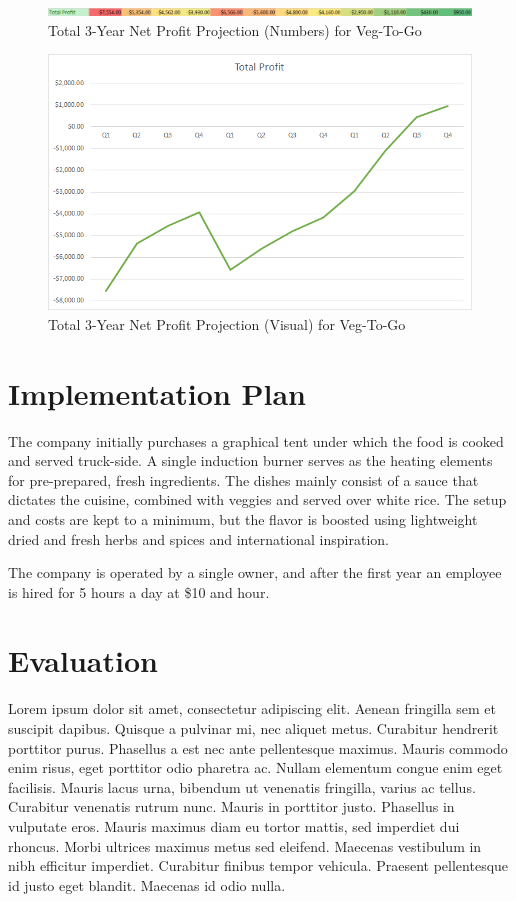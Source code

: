 \documentclass[12pt, letterpaper]{article}
\newcommand{\companyname}{Veg-To-Go}
\begin{document}
\begin{figure}[H]
	\caption{Total 3-Year Net Profit Projection (Numbers) for \companyname{}}
	\includegraphics[width=\textwidth]{TotalProfitNumbers}
\end{figure}

\begin{figure}[H]
	\caption{Total 3-Year Net Profit Projection (Visual) for \companyname{}}
	\includegraphics[width=\textwidth]{TotalProfit}
\end{figure}

\section{Implementation Plan}
The company initially purchases a graphical tent under which the food is cooked and served truck-side.  A single induction burner serves as the heating elements for pre-prepared, fresh ingredients.  The dishes mainly consist of a sauce that dictates the cuisine, combined with veggies and served over white rice.  The setup and costs are kept to a minimum, but the flavor is boosted using lightweight dried and fresh herbs and spices and international inspiration.

The company is operated by a single owner, and after the first year an employee is hired for 5 hours a day at \$10 and hour.

\section{Evaluation}
Lorem ipsum dolor sit amet, consectetur adipiscing elit. Aenean fringilla sem et suscipit dapibus. Quisque a pulvinar mi, nec aliquet metus. Curabitur hendrerit porttitor purus. Phasellus a est nec ante pellentesque maximus. Mauris commodo enim risus, eget porttitor odio pharetra ac. Nullam elementum congue enim eget facilisis. Mauris lacus urna, bibendum ut venenatis fringilla, varius ac tellus. Curabitur venenatis rutrum nunc. Mauris in porttitor justo. Phasellus in vulputate eros. Mauris maximus diam eu tortor mattis, sed imperdiet dui rhoncus. Morbi ultrices maximus metus sed eleifend. Maecenas vestibulum in nibh efficitur imperdiet. Curabitur finibus tempor vehicula. Praesent pellentesque id justo eget blandit. Maecenas id odio nulla.
\end{document}
